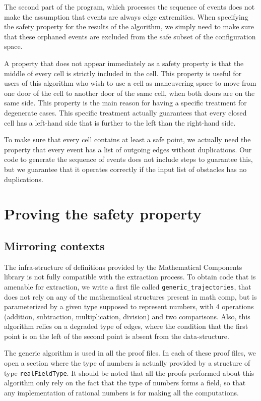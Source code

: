 \documentclass[a4paper, USenglish, cleveref, autoref, thm-restate]{lipics-v2021}
\begin{document}
The second part of the program, which processes the sequence of events
does not make the assumption that events are always edge extremities.
When specifying the safety
property for the results of the algorithm, we simply need to make sure
that these orphaned events are excluded from the safe subset of the
configuration space.

A property that does not appear immediately as a safety property is
that the middle of every cell is strictly included in the cell.  This
property is useful for users of this algorithm who wish to use a cell
as maneuvering space to move from one door of the cell to another door of
the same cell, when both doors are on the same side.  This property is
the main reason for having a specific treatment for degenerate cases.
This specific treatment actually guarantees that every closed cell has
a left-hand side that is further to the left than the
right-hand side.

To make sure that every cell contains at least a safe point, we
actually need the property that every event has a list of outgoing
edges without duplications.  Our code to generate the sequence of
events does not include steps to guarantee this, but we guarantee
that it operates correctly if the input
list of obstacles has no duplications.

\section{Proving the safety property}
\subsection{Mirroring contexts}
The infra-structure of definitions provided by the Mathematical
Components library is not fully compatible with the extraction
process.  To obtain code that is amenable for extraction, we write a
first file called {\tt generic\_trajectories}, that does not rely on
any of the mathematical structures present in math comp, but is
parameterized by a given type supposed to represent numbers, with 4
operations (addition, subtraction, multiplication, division) and two
comparisons.  Also, this algorithm relies on a degraded type of edges,
where the condition that the first point is on the left of the second
point is absent from the data-structure.

The generic algorithm is used in all the proof files.  In each of
these proof files, we open a section where the type of numbers is
actually provided by a structure of type {\tt realFieldType}.  It
should be noted that all the proofs performed about this algorithm
only rely on the fact that the type of numbers forms a field, so that
any implementation of rational numbers is for making all the
computations.
\end{document}
